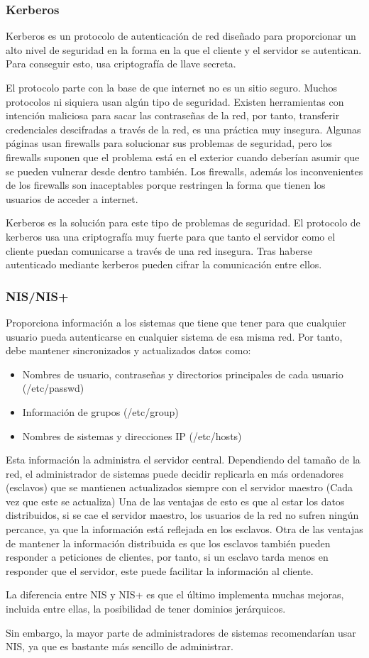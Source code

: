 \documentclass[titlepage, 12pt, a4paper]{article}
\begin{document}
\subsubsection{Kerberos}
Kerberos es un protocolo de autenticación de red diseñado para proporcionar un alto nivel de seguridad en la forma en la que el cliente y el servidor se autentican. Para conseguir esto, usa criptografía de llave secreta.\cite{mit-kerberos}\par El protocolo parte con la base de que internet no es un sitio seguro. Muchos protocolos ni siquiera usan algún tipo de seguridad. Existen herramientas con intención maliciosa para sacar las contraseñas de la red, por tanto, transferir credenciales descifradas a través de la red, es una práctica muy insegura. Algunas páginas usan \Gls{firewalls} para solucionar sus problemas de seguridad, pero los \Gls{firewalls} suponen que el problema está en el exterior cuando deberían asumir que se pueden vulnerar desde dentro también. Los firewalls, además los inconvenientes de los firewalls son inaceptables porque restringen la forma que tienen los usuarios de acceder a internet.\par Kerberos es la solución para este tipo de problemas de seguridad. El protocolo de kerberos usa una criptografía muy fuerte para que tanto el servidor como el cliente puedan comunicarse a través de una red insegura. Tras haberse autenticado mediante \Gls{kerberos} pueden cifrar la comunicación entre ellos.
\subsubsection{\Gls{NIS/NIS+}}
Proporciona información a los sistemas que tiene que tener para que cualquier usuario pueda autenticarse en cualquier sistema de esa misma red. Por tanto, debe mantener sincronizados y actualizados datos como:
\begin{itemize}
	\item Nombres de usuario, contraseñas y directorios principales de cada usuario (/etc/passwd)
	\item Información de grupos (/etc/group)
	\item Nombres de sistemas y direcciones IP (/etc/hosts)
\end{itemize}
Esta información la administra el servidor central. Dependiendo del tamaño de la red, el administrador de sistemas puede decidir replicarla en más ordenadores (esclavos) que se mantienen actualizados siempre con el servidor maestro (Cada vez que este se actualiza) Una de las ventajas de esto es que al estar los datos distribuidos, si se cae el servidor maestro, los usuarios de la red no sufren ningún percance, ya que la información está reflejada en los esclavos. Otra de las ventajas de mantener la información distribuida es que los esclavos también pueden responder a peticiones de clientes, por tanto, si un esclavo tarda menos en responder que el servidor, este puede facilitar la información al cliente.\par La diferencia entre NIS y NIS+ es que el último implementa muchas mejoras, incluida entre ellas, la posibilidad de tener dominios jerárquicos.\par Sin embargo, la mayor parte de administradores de sistemas recomendarían usar NIS, ya que es bastante más sencillo de administrar.
\end{document}
